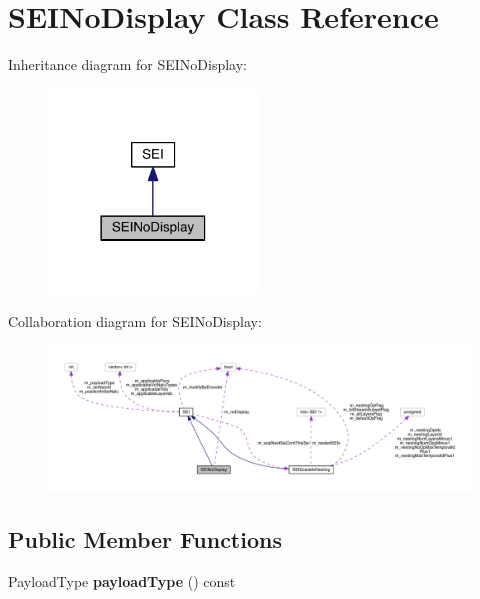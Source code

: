 \hypertarget{class_s_e_i_no_display}{}\section{S\+E\+I\+No\+Display Class Reference}
\label{class_s_e_i_no_display}


Inheritance diagram for S\+E\+I\+No\+Display\+:
\nopagebreak
\begin{figure}[H]
\begin{center}
\leavevmode
\includegraphics[width=158pt]{db/d14/class_s_e_i_no_display__inherit__graph}
\end{center}
\end{figure}


Collaboration diagram for S\+E\+I\+No\+Display\+:
\nopagebreak
\begin{figure}[H]
\begin{center}
\leavevmode
\includegraphics[width=350pt]{db/d29/class_s_e_i_no_display__coll__graph}
\end{center}
\end{figure}
\subsection*{Public Member Functions}
\begin{DoxyCompactItemize}
\item 
\mbox{\label{class_s_e_i_no_display_a58b2a2bd57ea53ef4408739c4f061dcd}} 
Payload\+Type {\bfseries payload\+Type} () const
\end{DoxyCompactItemize}
